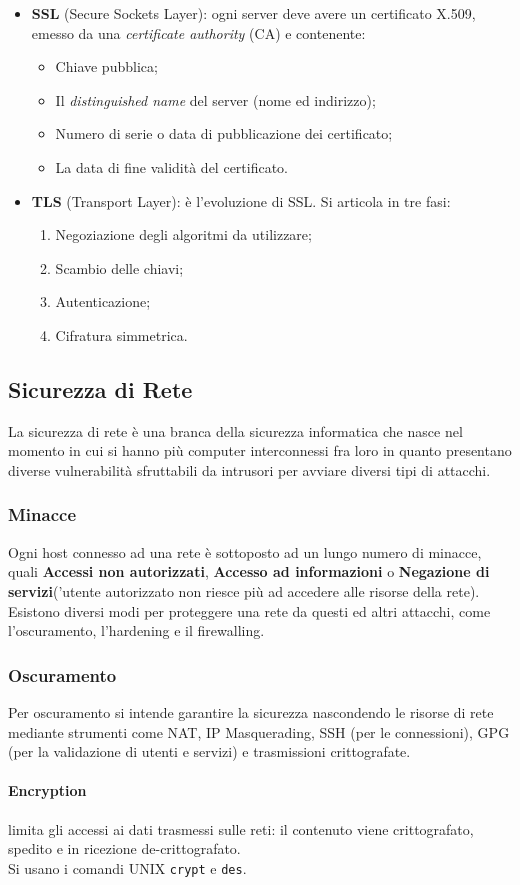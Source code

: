 \documentclass[a4paper,11pt]{article}
\def\code#1{\texttt{#1}}
\def\subsub#1{\subsubsection{#1}\label{#1}}
\def\italic#1{\textit{#1}}
\begin{document}
\begin{itemize}
\item \textbf{SSL} (Secure Sockets Layer): ogni server deve avere un certificato X.509, emesso da una \italic{certificate authority} (CA) e contenente:
\begin{itemize}
\item Chiave pubblica;
\item Il \italic{distinguished name} del server (nome ed indirizzo);
\item Numero di serie o data di pubblicazione dei certificato;
\item La data di fine validità del certificato.
\end{itemize}

\item \textbf{TLS} (Transport Layer): è l'evoluzione di SSL. Si articola in tre fasi:
\begin{enumerate}
\item Negoziazione degli algoritmi da utilizzare;
\item Scambio delle chiavi;
\item Autenticazione;
\item Cifratura simmetrica.
\end{enumerate}
\end{itemize}


\newpage
\subsection{Sicurezza di Rete}
La sicurezza di rete è una branca della sicurezza informatica che nasce nel momento in cui si hanno più computer interconnessi fra loro in quanto presentano diverse vulnerabilità sfruttabili da intrusori per avviare diversi tipi di attacchi.
\subsub{Minacce} 
Ogni host connesso ad una rete è sottoposto ad un lungo numero di minacce, quali \textbf{Accessi non autorizzati}, \textbf{Accesso ad informazioni} o \textbf{Negazione di servizi}('utente autorizzato non riesce più ad accedere alle risorse della rete).\\
Esistono diversi modi per proteggere una rete da questi ed altri attacchi, come l'oscuramento, l'hardening e il firewalling.
\subsub{Oscuramento}
Per oscuramento si intende garantire la sicurezza nascondendo le risorse di rete mediante strumenti come NAT, IP Masquerading, SSH (per le connessioni), GPG (per la validazione di utenti e servizi) e trasmissioni crittografate.
\paragraph{Encryption} limita gli accessi ai dati trasmessi sulle reti: il contenuto viene crittografato, spedito e in ricezione de-crittografato.\\
Si usano i comandi UNIX \code{crypt} e \code{des}.
\end{document}
